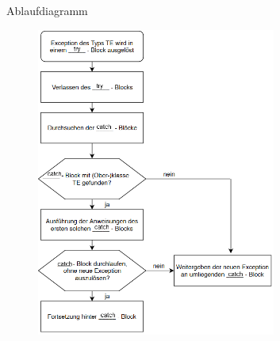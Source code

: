 \documentclass{../preamble}
\begin{document}
\begin{task}[credit = \stars{1}{3}]{Ablaufdiagramm}
    \clearpage

    \begin{solution}
        \begin{figure}[h]
            \centering
            \includegraphics[width = 0.7\textwidth]{graphics/V4_Solution}
        \end{figure}
    \end{solution}
\end{task}

\clearpage
\end{document}
